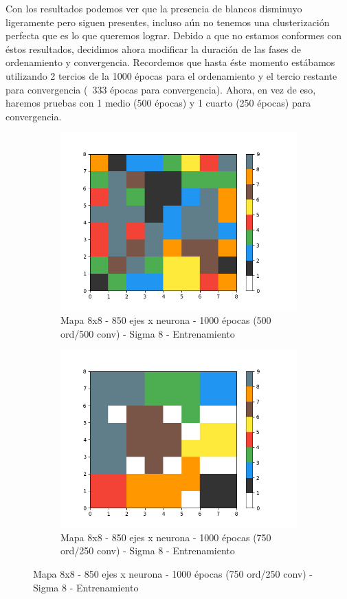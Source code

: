 Con los resultados podemos ver que la presencia de blancos disminuyo ligeramente pero siguen presentes, incluso aún no tenemos una clusterización perfecta que es lo que queremos lograr. Debido a que no estamos conformes con éstos resultados, decidimos ahora modificar la duración de las fases de ordenamiento y convergencia. Recordemos que hasta éste momento estábamos utilizando 2 tercios de la 1000 épocas para el ordenamiento y el tercio restante para convergencia (~333 épocas para convergencia). Ahora, en vez de eso, haremos pruebas con 1 medio (500 épocas) y 1 cuarto (250 épocas) para convergencia.

\begin{figure}[!htbp]
\centering
\begin{subfigure}{.5\textwidth}
  \centering
  \includegraphics[width=1\linewidth, scale=1]{../img/map8x8_1000ep_850en_sigma8_faseord500.png}
  \caption{Mapa 8x8 - 850 ejes x neurona - 1000 épocas (500 ord/500 conv) - Sigma 8 - Entrenamiento}
  \label{fig:sub1}
\end{subfigure}%
\begin{subfigure}{.5\textwidth}
  \centering
  \includegraphics[width=1\linewidth, scale=1]{../img/map8x8_1000ep_850en_sigma8_faseord750.png}
  \caption{Mapa 8x8 - 850 ejes x neurona - 1000 épocas (750 ord/250 conv) - Sigma 8 - Entrenamiento}
  \label{fig:sub2}
\end{subfigure}
\end{figure}

